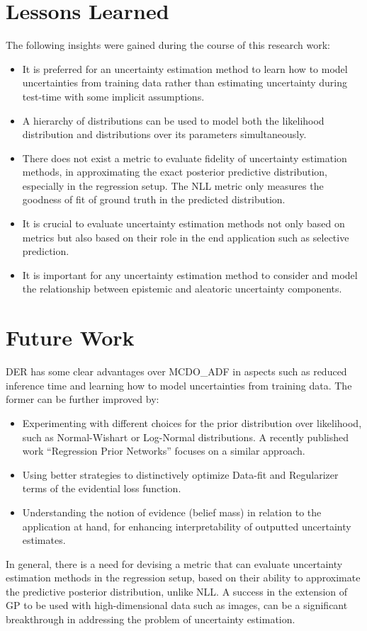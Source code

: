     \section{Lessons Learned}
    The following insights were gained during the course of this research work:
    \begin{itemize}
    	\item It is preferred for an uncertainty estimation method to learn how to model uncertainties from training data rather than estimating uncertainty during test-time with some implicit assumptions.
    	\item A hierarchy of distributions can be used to model both the likelihood distribution and distributions over its parameters simultaneously.
    	\item There does not exist a metric  to evaluate fidelity of uncertainty estimation methods, in approximating the exact posterior predictive  distribution, especially in the regression setup. The NLL metric only measures the goodness of fit of ground truth in the predicted distribution.
    	\item It is crucial to evaluate uncertainty estimation methods not only based on metrics but also based on their role in the end application such as selective prediction. 
    	\item It is important for any uncertainty estimation method to consider and model the relationship between epistemic and aleatoric uncertainty components.    	
    \end{itemize}

    \section{Future Work}
    DER has some clear advantages over MCDO\_ADF in aspects such as reduced inference time and learning how to model uncertainties from training data. The former can be further improved by:
    \begin{itemize}
    	\item Experimenting with different choices for the prior distribution over likelihood, such as Normal-Wishart or Log-Normal distributions. A recently published work \enquote{Regression Prior Networks} \cite{malinin2020regression} focuses on a similar approach.
    	\item Using better strategies to distinctively optimize Data-fit and Regularizer terms of the evidential loss function.
    	\item Understanding the notion of evidence (belief mass) in relation to the application at hand, for enhancing interpretability of outputted uncertainty estimates.
    \end{itemize}

    In general, there is a need for devising a metric that can evaluate uncertainty estimation methods in the regression setup, based on their ability to approximate the predictive posterior distribution, unlike NLL. A success in the extension of GP to be used with high-dimensional data such as images, can be a significant breakthrough in addressing the problem of uncertainty estimation.
    	 
    

